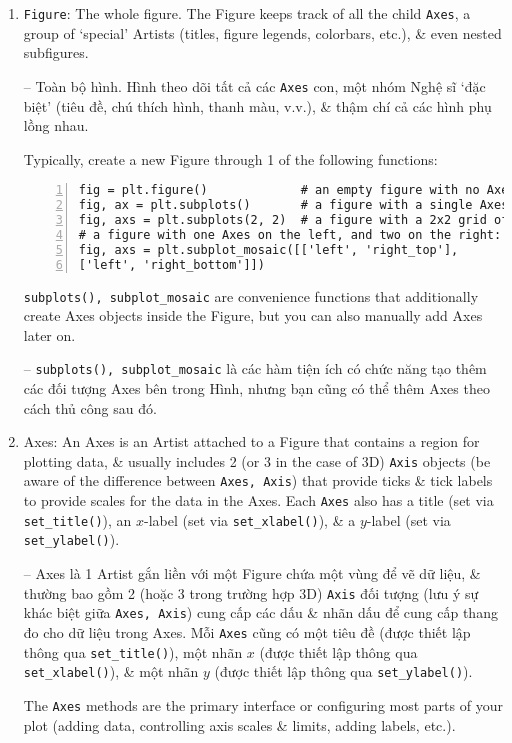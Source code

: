 \documentclass{article}
\begin{document}
\begin{enumerate}
    \item {\tt Figure}: The whole figure. The Figure keeps track of all the child {\tt Axes}, a group of `special' Artists (titles, figure legends, colorbars, etc.), \& even nested subfigures.
    
    -- Toàn bộ hình. Hình theo dõi tất cả các {\tt Axes} con, một nhóm Nghệ sĩ `đặc biệt' (tiêu đề, chú thích hình, thanh màu, v.v.), \& thậm chí cả các hình phụ lồng nhau.
    
    Typically, create a new Figure through 1 of the following functions:
    \begin{Verbatim}[numbers=left,xleftmargin=5mm]
fig = plt.figure()             # an empty figure with no Axes
fig, ax = plt.subplots()       # a figure with a single Axes
fig, axs = plt.subplots(2, 2)  # a figure with a 2x2 grid of Axes
# a figure with one Axes on the left, and two on the right:
fig, axs = plt.subplot_mosaic([['left', 'right_top'],
['left', 'right_bottom']])   
    \end{Verbatim}
    \verb|subplots(), subplot_mosaic| are convenience functions that additionally create Axes objects inside the Figure, but you can also manually add Axes later on.
    
    -- \verb|subplots(), subplot_mosaic| là các hàm tiện ích có chức năng tạo thêm các đối tượng Axes bên trong Hình, nhưng bạn cũng có thể thêm Axes theo cách thủ công sau đó.
    \item {\sf Axes}: An Axes is an Artist attached to a Figure that contains a region for plotting data, \& usually includes 2 (or 3 in the case of 3D) {\tt Axis} objects (be aware of the difference between {\tt Axes, Axis}) that provide ticks \& tick labels to provide scales for the data in the Axes. Each {\tt Axes} also has a title (set via \verb|set_title()|), an $x$-label (set via \verb|set_xlabel()|), \& a $y$-label (set via \verb|set_ylabel()|).
    
    -- Axes là 1 Artist gắn liền với một Figure chứa một vùng để vẽ dữ liệu, \& thường bao gồm 2 (hoặc 3 trong trường hợp 3D) {\tt Axis} đối tượng (lưu ý sự khác biệt giữa {\tt Axes, Axis}) cung cấp các dấu \& nhãn dấu để cung cấp thang đo cho dữ liệu trong Axes. Mỗi {\tt Axes} cũng có một tiêu đề (được thiết lập thông qua \verb|set_title()|), một nhãn $x$ (được thiết lập thông qua \verb|set_xlabel()|), \& một nhãn $y$ (được thiết lập thông qua \verb|set_ylabel()|).
    
    The {\tt Axes} methods are the primary interface or configuring most parts of your plot (adding data, controlling axis scales \& limits, adding labels, etc.).
    

\end{enumerate}
\end{document}
